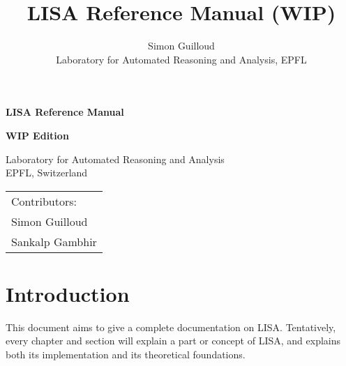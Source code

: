 \documentclass[11pt,a4paper]{book}
\title{LISA Reference Manual (WIP)}
\author{Simon Guilloud\\Laboratory for Automated Reasoning and Analysis, EPFL}
\date{}
\begin{document}
 

\newfontfamily{}

\begin{titlepage}
\titlefont 

    \begin{center}
        \vspace*{1cm}
 
        \textbf{\Huge LISA Reference Manual}
             
        \vspace{1.5cm}
        
        \textbf{\large WIP Edition}
             
        \vspace{1.5cm}
 
        {\Large Laboratory for Automated Reasoning and Analysis\\ EPFL, Switzerland}

        \vspace{1.5cm}

        \date{}

    \end{center}
    \vspace*{10em}
    \begin{flushright}\huge
        \begin{tabular}{l}
         Contributors: \hspace*{2em} \\[1em]
         Simon Guilloud\\
         Sankalp Gambhir
        \end{tabular}
    \end{flushright}
             
 \end{titlepage}
\chapter*{Introduction}

This document aims to give a complete documentation on LISA. Tentatively, every chapter and section will explain a part or concept of LISA, and explains both its implementation and its theoretical foundations. 

\tableofcontents













\end{document}
